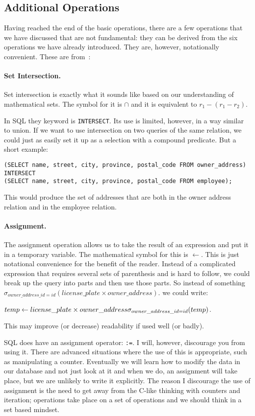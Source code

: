 \subsection*{Additional Operations}
Having reached the end of the basic operations, there are a few operations that we have discussed that are not fundamental: they can be derived from the six operations we have already introduced. They are, however, notationally convenient. These are from~\cite{dsc}:

\paragraph{Set Intersection.} Set intersection is exactly what it sounds like based on our understanding of mathematical sets. The symbol for it is $\cap$ and it is equivalent to $r_{1} - (r_{1} - r_{2})$.

In SQL they keyword is \texttt{INTERSECT}. Its use is limited, however, in a way similar to union. If we want to use intersection on two queries of the same relation, we could just as easily set it up as a selection with a compound predicate. But a short example:

\texttt{(SELECT name, street, city, province, postal\_code FROM owner\_address)\\ 
INTERSECT\\ 
(SELECT name, street, city, province, postal\_code FROM employee);}

This would produce the set of addresses that are both in the owner address relation and in the employee relation.

\paragraph{Assignment.} The assignment operation allows us to take the result of an expression and put it in a temporary variable. The mathematical symbol for this is $\leftarrow$. This is just notational convenience for the benefit of the reader. Instead of a complicated expression that requires several sets of parenthesis and is hard to follow, we could break up the query into parts and then use those parts. So instead of something $\sigma_{owner\_address\_id = id}( license\_plate \times owner\_address )$. we could write: 

$temp \leftarrow license\_plate \times owner\_address\\
\sigma_{owner\_address\_id = id}( temp ) $.

This may improve (or decrease) readability if used well (or badly).

SQL does have an assignment operator: \texttt{:=}. I will, however, discourage you from using it. There are advanced situations where the use of this is appropriate, such as manipulating a counter. Eventually we will learn how to modify the data in our database and not just look at it and when we do, an assignment will take place, but we are unlikely to write it explicitly. The reason I discourage the use of assignment is the need to get away from the C-like thinking with counters and iteration; operations take place on a set of operations and we should think in a set based mindset.




